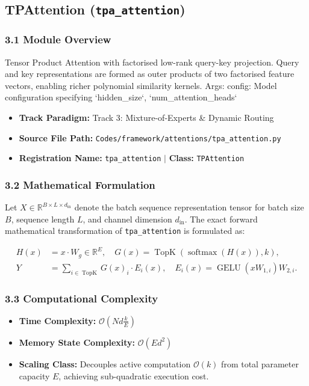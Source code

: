 \subsection{TPAttention (\texttt{tpa\_attention})}
\label{sec:app_module_tpa_attention}

\subsubsection*{3.1 Module Overview}
Tensor Product Attention with factorised low-rank query-key projection.  Query and key representations are formed as outer products of two factorised feature vectors, enabling richer polynomial similarity kernels.  Args:     config: Model configuration specifying `hidden\_size`, `num\_attention\_heads`
\begin{itemize}
    \item \textbf{Track Paradigm:} Track 3: Mixture-of-Experts & Dynamic Routing
    \item \textbf{Source File Path:} \texttt{Codes/framework/attentions/tpa\_attention.py}
    \item \textbf{Registration Name:} \texttt{tpa\_attention} $\mid$ \textbf{Class:} \texttt{TPAttention}
\end{itemize}

\subsubsection*{3.2 Mathematical Formulation}
Let $X \in \mathbb{R}^{B \times L \times d_{\text{in}}}$ denote the batch sequence representation tensor for batch size $B$, sequence length $L$, and channel dimension $d_{\text{in}}$. The exact forward mathematical transformation of \texttt{tpa\_attention} is formulated as:

\begin{align}
H(x) &= x \cdot W_g \in \mathbb{R}^{E}, \quad G(x) = \operatorname{TopK}\left(\operatorname{softmax}(H(x)), k\right), \\
Y &= \sum_{i \in \operatorname{TopK}} G(x)_i \cdot E_i(x), \quad E_i(x) = \operatorname{GELU}(x W_{1, i}) W_{2, i}.
\end{align}


\subsubsection*{3.3 Computational Complexity}
\begin{itemize}
    \item \textbf{Time Complexity:} $\mathcal{O}(N d \frac{k}{E})$
    \item \textbf{Memory State Complexity:} $\mathcal{O}(E d^2)$
    \item \textbf{Scaling Class:} Decouples active computation $\mathcal{O}(k)$ from total parameter capacity $E$, achieving sub-quadratic execution cost.
\end{itemize}

